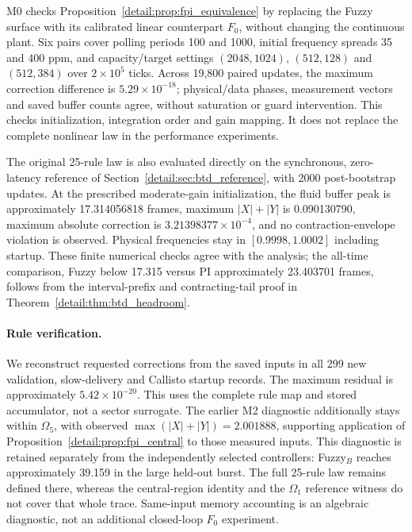 M0 checks Proposition~\ref{detail:prop:fpi_equivalence} by replacing the Fuzzy
surface with its calibrated linear counterpart $F_0$, without changing
the continuous plant. Six pairs cover polling periods 100 and 1000,
initial frequency spreads 35 and 400 ppm, and capacity/target settings
$(2048,1024)$, $(512,128)$ and $(512,384)$ over $2\times10^5$ ticks.
Across 19,800 paired updates, the maximum correction difference is
$5.29\times10^{-18}$; physical/data phases, measurement vectors and
saved buffer counts agree, without saturation or guard intervention.
This checks initialization, integration order and gain mapping. It does
not replace the complete nonlinear law in the performance experiments.

The original 25-rule law is also evaluated directly on the synchronous,
zero-latency reference of Section~\ref{detail:sec:btd_reference}, with 2000
post-bootstrap updates. At the prescribed moderate-gain initialization,
the fluid buffer peak is approximately 17.314056818 frames, maximum
$|X|+|Y|$ is 0.090130790, maximum absolute correction is
$3.21398377\times10^{-4}$, and no contraction-envelope violation is
observed. Physical frequencies stay in $[0.9998,1.0002]$ including
startup. These finite numerical checks agree with the analysis; the
all-time comparison, Fuzzy below 17.315 versus PI approximately
23.403701 frames, follows from the interval-prefix and contracting-tail
proof in Theorem~\ref{detail:thm:btd_headroom}.

\paragraph{Rule verification.}
We reconstruct requested corrections from the saved inputs in all 299
new validation, slow-delivery and Callisto startup records. The maximum
residual is approximately $5.42\times10^{-20}$. This uses the complete
rule map and stored accumulator, not a sector surrogate. The earlier
M2 diagnostic additionally stays within $\Omega_5$, with observed
$\max(|X|+|Y|)=2.001888$, supporting application of
Proposition~\ref{detail:prop:fpi_central} to those measured inputs. This
diagnostic is retained separately from the independently selected
controllers: Fuzzy$_B$ reaches approximately 39.159 in the large
held-out burst. The full 25-rule law remains defined there, whereas
the central-region identity and the $\Omega_1$ reference witness do
not cover that whole trace. Same-input memory accounting is an
algebraic diagnostic, not an additional closed-loop $F_0$ experiment.

